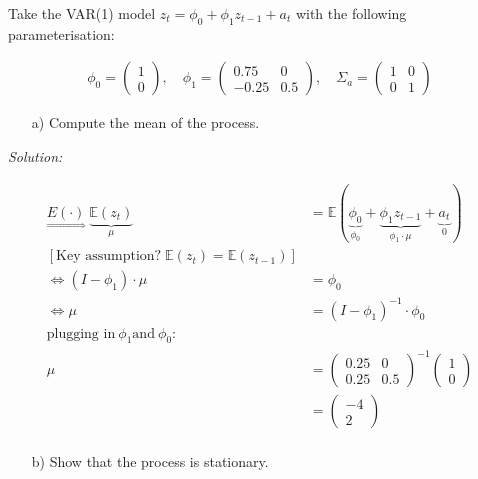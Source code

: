 \documentclass[12pt,a4paper]{article}
\begin{document}
Take the VAR(1) model \(z_t = \phi_0 + \phi_1 z_{t-1} + a_t\) with the
following parameterisation:

\begin{align*}
    \phi_0 = \begin{pmatrix} 1 \\ 0 \end{pmatrix}, \quad \phi_1 = \begin{pmatrix} 0.75 & 0 \\ -0.25 & 0.5 \end{pmatrix}, \quad \Sigma_a = \begin{pmatrix} 1 & 0 \\ 0 & 1 \end{pmatrix}
\end{align*}

\begin{itemize}
    \item[a)] Compute the mean of the process.
\end{itemize}

\emph{Solution:}

\begin{align*}
  \underset{\Rightarrow}{E(\cdot)} \; \underbrace{ \mathbb{E} (z_t)}_{\mu} & = \mathbb{E} \left(  \underbrace{\phi_0}_{\phi_0} + \underbrace{\phi_1 z_{t -1}}_{\phi_1 \cdot \mu}+ \underbrace{a_t}_{0}\right)\\
  \left[ \text{Key assumption?} \;  \mathbb{E} (z_t)  = \mathbb{E} (z_{t-1}) \right]\\
  \Leftrightarrow \left( I - \phi_1 \right) \cdot \mu & = \phi_0\\
  \Leftrightarrow \mu & = \left( I - \phi_1 \right)^{-1} \cdot \phi_0\\
  \text{plugging in} \ \phi_1 \text{and} \ \phi_0:\\
  \mu & = \begin{pmatrix} 
  0.25 & 0 \\
  0.25 & 0.5
  \end{pmatrix}^{-1} 
  \begin{pmatrix} 
  1 \\
  0
  \end{pmatrix}\\
  & = 
  \begin{pmatrix} 
  -4 \\
  2
  \end{pmatrix}\\
\end{align*}

\begin{itemize}
    \item[b)] Show that the process is stationary.
\end{itemize}
\end{document}
